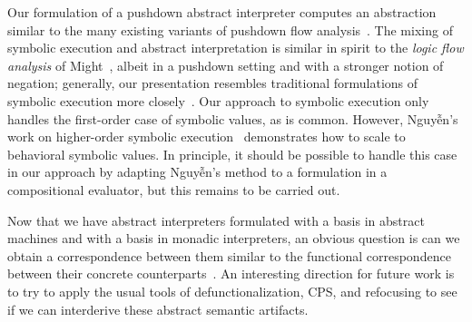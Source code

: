Our formulation of a pushdown abstract interpreter computes an abstraction
similar to the many existing variants of pushdown flow analysis~\cite%
{dvanhorn:Vardoulakis2011CFA2%
,dvanhorn:Earl2010Pushdown%
,local:vardoulakis-diss12%
,dvanhorn:VanHorn2012Systematic%
,dvanhorn:Earl2012Introspective%
,dvanhorn:Johnson2014Abstracting%
,dvanhorn:Johnson2014Pushdown%
,local:p4f%
}.
The mixing of symbolic execution and abstract interpretation is
similar in spirit to the \emph{logic flow analysis} of
Might~\cite{local:might-popl07}, albeit in a pushdown setting and with
a stronger notion of negation; generally, our presentation resembles
traditional formulations of symbolic execution more
closely~\cite{dvanhorn:King1976Symbolic}.  Our approach to symbolic
execution only handles the first-order case of symbolic values, as is
common.  However, Nguyễn's work on higher-order symbolic
execution~\cite{dvanhorn:Nguyen2015Relatively} demonstrates how to
scale to behavioral symbolic values.  In principle, it should be
possible to handle this case in our approach by adapting Nguyễn's
method to a formulation in a compositional evaluator, but this remains
to be carried out.

Now that we have abstract interpreters formulated with a basis in abstract
machines and with a basis in monadic interpreters, an obvious question is can
we obtain a correspondence between them similar to the functional
correspondence between their concrete
counterparts~\cite{dvanhorn:Ager2005Functional}.  An interesting direction for
future work is to try to apply the usual tools of defunctionalization, CPS, and
refocusing to see if we can interderive these abstract semantic artifacts.
